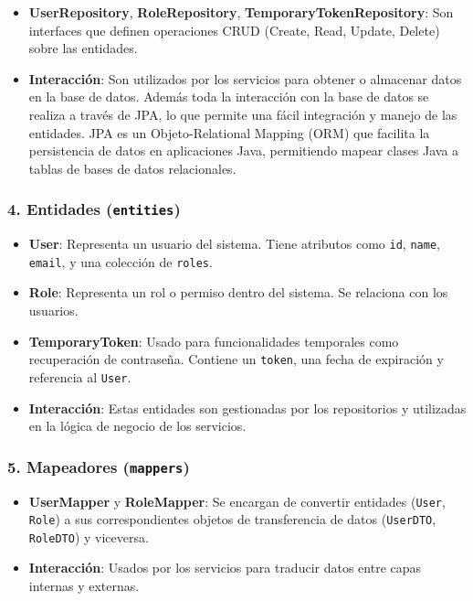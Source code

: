 \begin{itemize}
  \item \textbf{UserRepository}, \textbf{RoleRepository}, \textbf{TemporaryTokenRepository}: Son interfaces que definen operaciones CRUD (Create, Read, Update, Delete) sobre las entidades.
  \item \textbf{Interacción}: Son utilizados por los servicios para obtener o almacenar datos en la base de datos.
  Además toda la interacción con la base de datos se realiza a través de JPA, lo que permite una fácil integración y manejo de las entidades. JPA es un Objeto-Relational Mapping (ORM) que facilita la persistencia de datos en aplicaciones Java, permitiendo mapear clases Java a tablas de bases de datos relacionales.
\end{itemize}

\subsubsection*{4. Entidades (\texttt{entities})}

\begin{itemize}
  \item \textbf{User}: Representa un usuario del sistema. Tiene atributos como \texttt{id}, \texttt{name}, \texttt{email}, y una colección de \texttt{roles}.
  \item \textbf{Role}: Representa un rol o permiso dentro del sistema. Se relaciona con los usuarios.
  \item \textbf{TemporaryToken}: Usado para funcionalidades temporales como recuperación de contraseña. Contiene un \texttt{token}, una fecha de expiración y referencia al \texttt{User}.
  \item \textbf{Interacción}: Estas entidades son gestionadas por los repositorios y utilizadas en la lógica de negocio de los servicios.
\end{itemize}

\subsubsection*{5. Mapeadores (\texttt{mappers})}

\begin{itemize}
  \item \textbf{UserMapper} y \textbf{RoleMapper}: Se encargan de convertir entidades (\texttt{User}, \texttt{Role}) a sus correspondientes objetos de transferencia de datos (\texttt{UserDTO}, \texttt{RoleDTO}) y viceversa.
  \item \textbf{Interacción}: Usados por los servicios para traducir datos entre capas internas y externas.
\end{itemize}

